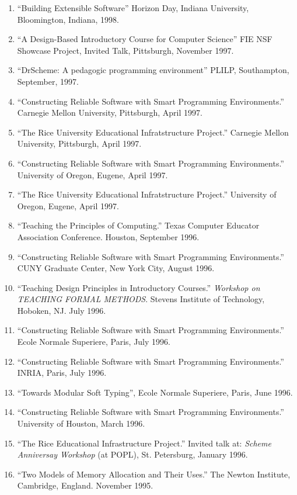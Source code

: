 \begin{enumerate}
\item{}``Building Extensible Software''
Horizon Day, Indiana University, Bloomington, Indiana, 1998.

\item{}``A Design-Based Introductory Course for Computer Science''
 FIE NSF Showcase Project, Invited Talk, Pittsburgh, November 1997.
\item{}``DrScheme: A pedagogic programming environment''
 PLILP, Southampton, September, 1997.
\item{}``Constructing Reliable Software with Smart Programming
Environments.'' Carnegie Mellon University, Pittsburgh, April 1997.
\item{}``The Rice University Educational Infratstructure Project.''
Carnegie Mellon University, Pittsburgh, April 1997.
\item{}``Constructing Reliable Software with Smart Programming
Environments.'' University of Oregon, Eugene, April 1997.
\item{}``The Rice University Educational Infratstructure Project.''
University of Oregon, Eugene, April 1997.
\item{}``Teaching the Principles of Computing.'' Texas Computer Educator
Association Conference. Houston, September 1996.
\item{}``Constructing Reliable Software with Smart Programming
Environments.'' CUNY Graduate Center, New York City, August 1996.
\item{}``Teaching Design Principles in Introductory Courses.''
{\it Workshop on TEACHING FORMAL METHODS\/}. Stevens Institute of
Technology, Hoboken, NJ. July 1996.  
\item{}``Constructing Reliable Software with Smart Programming
Environments.'' Ecole Normale Superiere, Paris, July 1996.
\item{}``Constructing Reliable Software with Smart Programming
Environments.'' INRIA, Paris, July 1996.
\item{}``Towards Modular Soft Typing'',  Ecole Normale Superiere, 
Paris, June 1996.
\item{}``Constructing Reliable Software with Smart Programming
Environments.'' University of Houston, March 1996.
\item{}``The Rice Educational Infrastructure Project.'' 
Invited talk at: {\it Scheme Anniversay Workshop\/} (at POPL),
St. Petersburg, January 1996.
\item{}``Two Models of Memory Allocation and Their Uses.'' The
Newton Institute, Cambridge, England. November 1995. 

\end{enumerate}
